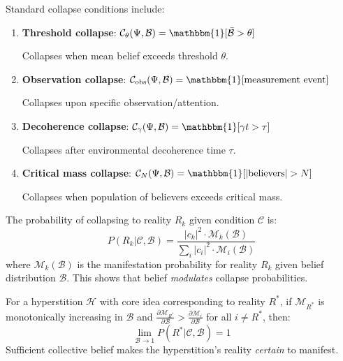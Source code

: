 \begin{definition}
\label{def:collapse-types}
Standard collapse conditions include:
\begin{enumerate}
    \item \textbf{Threshold collapse}: $\mathcal{C}_{\theta}(\Psi, \mathcal{B}) = \mathbbm{1}[\bar{\mathcal{B}} > \theta]$

    Collapses when mean belief exceeds threshold $\theta$.

    \item \textbf{Observation collapse}: $\mathcal{C}_{\text{obs}}(\Psi, \mathcal{B}) = \mathbbm{1}[\text{measurement event}]$

    Collapses upon specific observation/attention.

    \item \textbf{Decoherence collapse}: $\mathcal{C}_{\gamma}(\Psi, \mathcal{B}) = \mathbbm{1}[\gamma t > \tau]$

    Collapses after environmental decoherence time $\tau$.

    \item \textbf{Critical mass collapse}: $\mathcal{C}_{N}(\Psi, \mathcal{B}) = \mathbbm{1}[|\text{believers}| > N]$

    Collapses when population of believers exceeds critical mass.
\end{enumerate}
\end{definition}

\begin{definition}
\label{def:collapse-probability}
The probability of collapsing to reality $R_k$ given condition $\mathcal{C}$ is:
\begin{equation}
\boxed{
P(R_k | \mathcal{C}, \mathcal{B}) = \frac{|c_k|^2 \cdot \mathcal{M}_k(\mathcal{B})}{\sum_i |c_i|^2 \cdot \mathcal{M}_i(\mathcal{B})}
}
\end{equation}
where $\mathcal{M}_k(\mathcal{B})$ is the manifestation probability for reality $R_k$ given belief distribution $\mathcal{B}$. This shows that belief \emph{modulates} collapse probabilities.
\end{definition}

\begin{theorem}
\label{thm:belief-enhanced-collapse}
For a hyperstition $\mathcal{H}$ with core idea corresponding to reality $R^*$, if $\mathcal{M}_{R^*}$ is monotonically increasing in $\mathcal{B}$ and $\frac{\partial \mathcal{M}_{R^*}}{\partial \mathcal{B}} > \frac{\partial \mathcal{M}_i}{\partial \mathcal{B}}$ for all $i \neq R^*$, then:
\[
\lim_{\mathcal{B} \to 1} P(R^* | \mathcal{C}, \mathcal{B}) = 1
\]
Sufficient collective belief makes the hyperstition's reality \emph{certain} to manifest.
\end{theorem}


